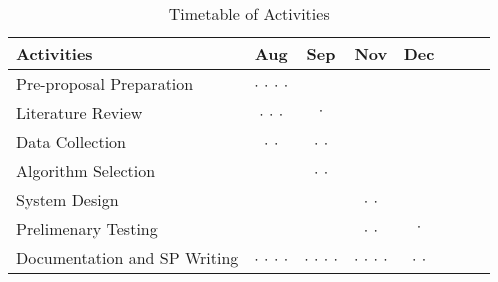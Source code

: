 	
	\begin{table}[h!]
		\centering
		\renewcommand{\arraystretch}{1.5} %
		\setlength{\tabcolsep}{5pt}       %
		\begin{tabular}{|l|c|c|c|c|c|c|c|}
			\hline
			\textbf{Activities} & \textbf{Aug} & \textbf{Sep} & \textbf{Nov} & \textbf{Dec} \\ \hline
			Pre-proposal Preparation  & $\cdot$ $\cdot$ $\cdot$ $\cdot$ &     &     &  \\ \hline
			Literature Review & $\cdot$ $\cdot$ $\cdot$ & $\cdot$\hspace*{\fill} &  &     \\ \hline
			Data Collection  & \hspace*{\fill} $\cdot$ $\cdot$& $\cdot$ $\cdot$\hspace*{\fill}&  &  \\ \hline
			Algorithm Selection &     &$\cdot$ $\cdot$&     &     \\ \hline
			System Design  &     &    \hspace*{\fill}{$\cdot$ } & $\cdot$ $\cdot$  \hspace*{\fill}   &    \\ \hline
			Prelimenary Testing &     &     & \hspace*{\fill} $\cdot$ $\cdot$   & $\cdot$ \hspace*{\fill}\\ \hline
			Documentation and SP Writing  & $\cdot$ $\cdot$ $\cdot$ $\cdot$ & $\cdot$ $\cdot$ $\cdot$ $\cdot$ & $\cdot$ $\cdot$ $\cdot$ $\cdot$ & $\cdot$ $\cdot$ \hspace*{\fill}\\ \hline
		\end{tabular}
		\caption{Timetable of Activities}
	\end{table}
	
	